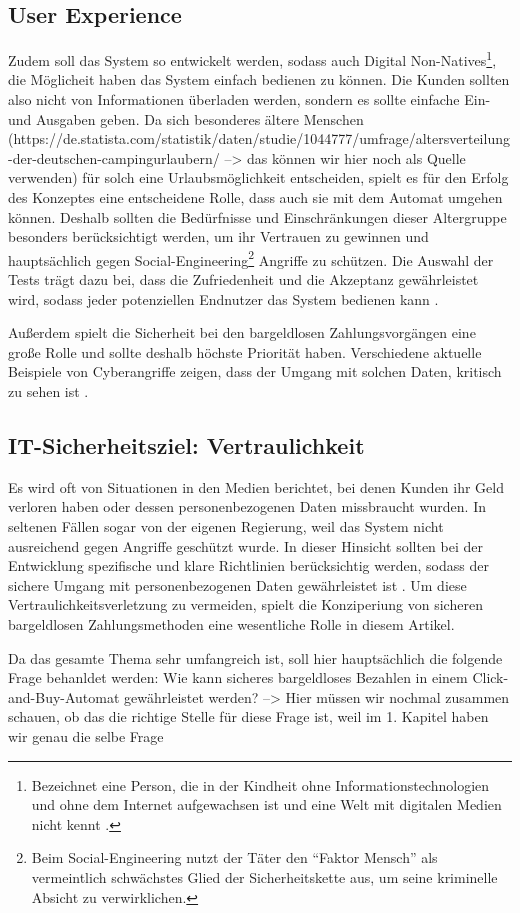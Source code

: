 \subsection{User Experience}
Zudem soll das System so entwickelt werden, sodass auch Digital Non-Natives\footnote{Bezeichnet
eine Person, die in der Kindheit ohne Informationstechnologien und ohne dem Internet aufgewachsen ist 
und eine Welt mit digitalen Medien nicht kennt \cite{misc:MSND}.}, die Möglicheit \cite{refart:QWDN} haben
das System einfach bedienen zu können. Die Kunden sollten also nicht von Informationen überladen werden, 
sondern es sollte einfache Ein- und Ausgaben geben. Da sich besonderes ältere Menschen 
(https://de.statista.com/statistik/daten/studie/1044777/umfrage/altersverteilung-der-deutschen-campingurlaubern/ --> das können wir hier noch als Quelle verwenden)
für solch eine 
Urlaubsmöglichkeit entscheiden, spielt es für den Erfolg des Konzeptes eine entscheidene Rolle, dass auch
sie mit dem Automat umgehen können. Deshalb sollten die Bedürfnisse und Einschränkungen dieser Altergruppe
besonders berücksichtigt werden, um ihr Vertrauen zu gewinnen \cite{refart:HLAU} und hauptsächlich gegen
Social-Engineering\footnote{Beim Social-Engineering nutzt der Täter den ``Faktor Mensch'' als vermeintlich 
schwächstes Glied der Sicherheitskette aus, um seine kriminelle Absicht zu verwirklichen.\cite{booklet:BSSE}} 
Angriffe zu schützen. Die Auswahl der Tests trägt dazu bei, dass die Zufriedenheit und die Akzeptanz
gewährleistet wird, sodass jeder potenziellen Endnutzer das System bedienen kann \cite{refbook:IASE}.

Außerdem spielt die Sicherheit bei den bargeldlosen Zahlungsvorgängen eine große Rolle und sollte
deshalb höchste Priorität haben. Verschiedene aktuelle Beispiele von Cyberangriffe zeigen, dass der 
Umgang mit solchen Daten, kritisch zu sehen ist \cite{booklet:BKCB}. 

\subsection{IT-Sicherheitsziel: Vertraulichkeit}
Es wird oft von Situationen in den Medien berichtet, bei denen Kunden ihr Geld verloren haben oder dessen
personenbezogenen Daten missbraucht wurden. In seltenen Fällen sogar von der eigenen Regierung, weil das System 
nicht ausreichend gegen Angriffe geschützt wurde. In dieser Hinsicht sollten bei der Entwicklung spezifische 
und klare Richtlinien berücksichtig werden, sodass der sichere Umgang mit personenbezogenen Daten gewährleistet ist 
\cite{refart:TRVR}. Um diese Vertraulichkeitsverletzung zu vermeiden, spielt die Konziperiung von sicheren 
bargeldlosen Zahlungsmethoden eine wesentliche Rolle in diesem Artikel. 

Da das gesamte Thema sehr umfangreich ist, soll hier hauptsächlich die folgende Frage behanldet werden: 
Wie kann sicheres bargeldloses Bezahlen in einem Click-and-Buy-Automat gewährleistet werden?
--> Hier müssen wir nochmal zusammen schauen, ob das die richtige Stelle für diese Frage ist, weil im 1. Kapitel haben wir genau die selbe Frage 